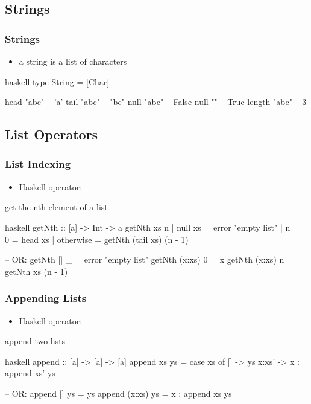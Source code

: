 \documentclass[dvipsnames]{beamer}
\theoremstyle{plain}
\begin{document}
\subsection{Strings}

\begin{frame}[fragile]
  \frametitle{Strings}

  \begin{itemize}
    \item a string is a list of characters
  \end{itemize}

  \begin{exampleblock}{}
    \begin{pygments}{haskell}
type String = [Char]

head "abc"      -- 'a'
tail "abc"      -- "bc"
null "abc"      -- False
null ""         -- True
length "abc"    -- 3
    \end{pygments}
  \end{exampleblock}
\end{frame}

\subsection{List Operators}

\begin{frame}[fragile]
  \frametitle{List Indexing}

  \begin{itemize}
    \item Haskell operator: 
  \end{itemize}

  \begin{exampleblock}{get the nth element of a list}
    \begin{pygments}{haskell}
getNth :: [a] -> Int -> a
getNth xs n
  | null xs   = error "empty list"
  | n == 0    = head xs
  | otherwise = getNth (tail xs) (n - 1)

-- OR:
getNth [] _     = error "empty list"
getNth (x:xs) 0 = x
getNth (x:xs) n = getNth xs (n - 1)
    \end{pygments}
  \end{exampleblock}
\end{frame}

\begin{frame}[fragile]
  \frametitle{Appending Lists}

  \begin{itemize}
    \item Haskell operator: 
  \end{itemize}

  \begin{exampleblock}{append two lists}
    \begin{pygments}{haskell}
append :: [a] -> [a] -> [a]
append xs ys =
    case xs of
      []    -> ys
      x:xs' -> x : append xs' ys

-- OR:
append []     ys = ys
append (x:xs) ys = x : append xs ys
    \end{pygments}
  \end{exampleblock}
\end{frame}
\end{document}
